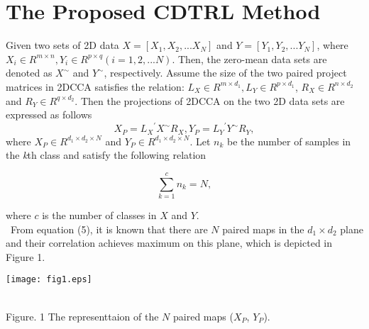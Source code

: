 \documentclass[journal]{IEEEtran}
\begin{document}
\section{The Proposed CDTRL Method}
Given two sets of 2D data $X = [{X_1},{X_2},...{X_N}]$ and $Y = [{Y_1},{Y_2},...{Y_N}]$, where $ {X_i} \in {R^{m \times n}},{Y_i} \in {R^{p \times q}} (i=1,2,...N)$. Then, the zero-mean data sets are denoted as $X^{\sim}$ and $Y^{\sim}$, respectively. Assume the size of the two paired project matrices in 2DCCA satisfies the relation: $ L_X \in {R^{m \times {d_1}}}, L_Y \in {R^{p \times {d_1}}}$, $ R_X \in {R^{n \times {d_2} }}$ and $R_Y \in {R^{q \times {d_2} }}$. Then the projections of 2DCCA on the two 2D data sets are expressed as follows
\begin{equation}
 {X_{P}} = {L_X}^\prime {X^{\sim}}{R_X}, {Y_{P}} = {L_Y}^\prime {Y^{\sim}}{R_Y},
\end{equation}
where ${X_{P}} \in {R^{d_1 \times d_2 \times N}}$ and ${Y_{P}} \in {R^{d_1 \times d_2 \times N}}$. Let $n_k$ be the number of samples in the \emph{k}th class and satisfy the following relation
\begin{small}
\begin{equation}
\sum\limits_{k = 1}^c {{n_k} = N},
\end{equation}
\end{small}
where $c$ is the number of classes in $X$ and $Y$.\\\ From equation (5), it is known that there are $N$ paired maps in the ${d_1} \times {d_2}$ plane and their correlation achieves maximum on this plane, which is depicted in Figure 1.\\
\centerline{\texttt{[image: fig1.eps]}}\\ {Figure. 1 The representtaion of the $N$ paired maps ($X_P$, $Y_P$). }\\
\end{document}
